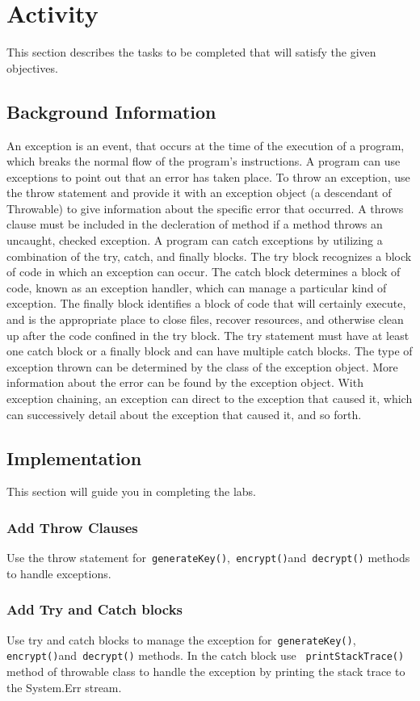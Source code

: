\section{Activity}
This section describes the tasks to be completed that will satisfy the given objectives.
\subsection{Background Information}

An exception is an event, that occurs at the time of the execution of a program, which breaks the normal flow of the program's instructions. A program can use exceptions to point out that an error has taken place. To throw an exception, use the throw statement and provide it with an exception object (a descendant of Throwable) to give information about the specific error that occurred. A throws clause must be included in the decleration of method if a method throws an uncaught, checked exception. A program can catch exceptions by utilizing a combination of the try, catch, and finally blocks. The try block recognizes a block of code in which an exception can occur. The catch block determines a block of code, known as an exception handler, which can manage a particular kind of exception. The finally block identifies a block of code that will certainly execute, and is the appropriate place to close files, recover resources, and otherwise clean up after the code confined in the try block. The try statement must have at least one catch block or a finally block and can have multiple catch blocks. The type of exception thrown can be determined by the class of the exception object. More information about the error can be found by the exception object. With exception chaining, an exception can direct to the exception that caused it, which can successively detail about the exception that caused it, and so forth.

\subsection{Implementation}
This section will guide you in completing the labs.
\subsubsection{Add Throw Clauses} 

Use the throw statement for\verb= generateKey()=,\verb= encrypt()=and\verb= decrypt()= methods to handle exceptions.

\subsubsection{ Add Try and Catch blocks}
Use try and catch blocks to manage the exception for\verb= generateKey()=,\verb= encrypt()=and\verb= decrypt()= methods. In the catch block use \verb= printStackTrace()= method of throwable class to handle the exception by printing the stack trace to the System.Err stream.


